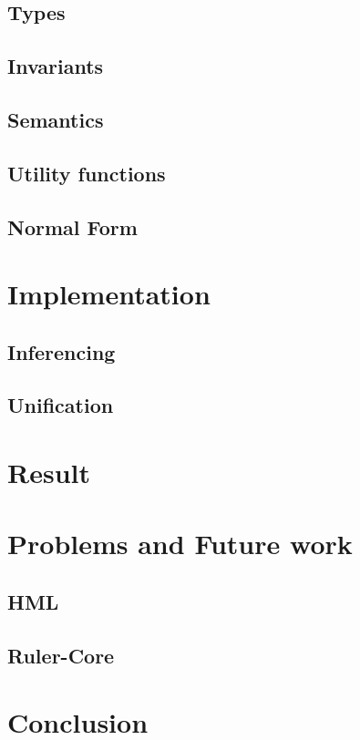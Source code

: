 \subsection{Types}

\subsection{Invariants}

\subsection{Semantics}

\subsection{Utility functions}

\subsection{Normal Form}

\section{Implementation}

\subsection{Inferencing}

\subsection{Unification}

%
%

\section{Result}

\section{Problems and Future work}

\subsection{HML}

\subsection{Ruler-Core}

\section{Conclusion}
